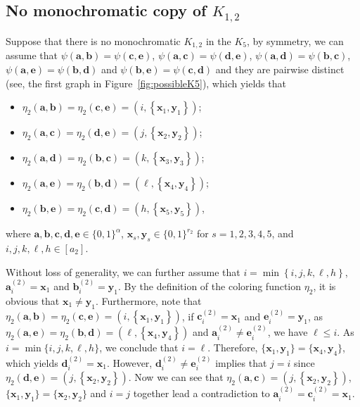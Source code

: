 \documentclass[11pt]{article}
\theoremstyle{definition}
\newcommand{\aaa}{\boldsymbol{a}}
\newcommand{\bb}{\boldsymbol{b}}
\newcommand{\cc}{\boldsymbol{c}}
\newcommand{\dd}{\boldsymbol{d}}
\newcommand{\ee}{\boldsymbol{e}}
\begin{document}
\subsection{No monochromatic copy of $K_{1,2}$}
Suppose that there is no monochromatic $K_{1,2}$ in the $K_{5}$, by symmetry, we can assume that $\psi(\aaa,\bb)=\psi(\cc,\ee)$, $\psi(\aaa,\cc)=\psi(\dd,\ee)$, $\psi(\aaa,\dd)=\psi(\bb,\cc)$, $\psi(\aaa,\ee)=\psi(\bb,\dd)$ and $\psi(\bb,\ee)=\psi(\cc,\dd)$ and they are pairwise distinct (see, the first graph in Figure~\ref{fig:possibleK5}), which yields that
\begin{itemize}
    \item $\eta_{2}(\aaa,\bb)=\eta_{2}(\cc,\ee)=(i,\left\{\boldsymbol{x}_{1},\boldsymbol{y}_{1}\right\})$;
    \item $\eta_{2}(\aaa,\cc)=\eta_{2}(\dd,\ee)=(j,\left\{\boldsymbol{x}_{2},\boldsymbol{y}_{2}\right\})$;
    \item $\eta_{2}(\aaa,\dd)=\eta_{2}(\bb,\cc)=(k,\left\{\boldsymbol{x}_{3},\boldsymbol{y}_{3}\right\})$;
    \item $\eta_{2}(\aaa,\ee)=\eta_{2}(\bb,\dd)=(\ell,\left\{\boldsymbol{x}_{4},\boldsymbol{y}_{4}\right\})$;
    \item $\eta_{2}(\bb,\ee)=\eta_{2}(\cc,\dd)=(h,\left\{\boldsymbol{x}_{5},\boldsymbol{y}_{5}\right\})$,
\end{itemize}
where $\boldsymbol{a},\bb,\cc,\dd,\ee\in\{0,1\}^{\alpha}$, $\boldsymbol{x}_{s},\boldsymbol{y}_{s}\in\{0,1\}^{r_{2}}$ for $s=1,2,3,4,5$, and $i,j,k,\ell,h\in [a_{2}]$.

Without loss of generality, we can further assume that $i=\min\left\{i,j,k,\ell,h\right\}$, $\boldsymbol{a}_i^{(2)}=\boldsymbol{x}_{1}$ and  
$\boldsymbol{b}_i^{(2)}=\boldsymbol{y}_{1}$. By the definition of the coloring function $\eta_{2}$, it is obvious that $\boldsymbol{x}_{1}\neq\boldsymbol{y}_{1}$. Furthermore, note that $\eta_{2}(\aaa,\bb)=\eta_{2}(\cc,\ee)=(i,\left\{\boldsymbol{x}_{1},\boldsymbol{y}_{1}\right\})$, if $\boldsymbol{c}_i^{(2)}=\boldsymbol{x}_{1}$ and
$\boldsymbol{e}_i^{(2)}=\boldsymbol{y}_{1}$, as $\eta_{2}(\aaa,\ee)=\eta_{2}(\bb,\dd)=(\ell,\left\{\boldsymbol{x}_{4},\boldsymbol{y}_{4}\right\})$ and $\aaa_{i}^{(2)}\neq \ee_{i}^{(2)}$, we have $\ell\le i$. As $i=\min\{i,j,k,\ell,h\}$, we conclude that $i=\ell$. Therefore, $\{\boldsymbol{x}_{1},\boldsymbol{y}_{1}\}=\{\boldsymbol{x}_{4},\boldsymbol{y}_{4}\}$, which yields $\boldsymbol{d}_i^{(2)}=\boldsymbol{x}_{1}$. However, $\boldsymbol{d}_i^{(2)}\neq \boldsymbol{e}_i^{(2)}$ implies that $j=i$ since $\eta_{2}(\dd,\ee)=(j,\left\{\boldsymbol{x}_{2},\boldsymbol{y}_{2}\right\})$. Now we can see that $\eta_{2}(\aaa,\cc)=(j,\left\{\boldsymbol{x}_{2},\boldsymbol{y}_{2}\right\})$, $\{\boldsymbol{x}_{1},\boldsymbol{y}_{1}\}=\{\boldsymbol{x}_{2},\boldsymbol{y}_{2}\}$ and $i=j$ together lead a contradiction to $\aaa_{i}^{(2)}=\cc_{i}^{(2)}=\boldsymbol{x}_{1}$.
\end{document}
